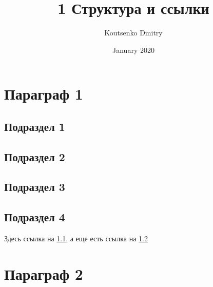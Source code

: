 \documentclass[a4paper,12pt]{article}   %
\title{1 Структура и ссылки}
\author{Koutsenko Dmitry}
\date{January 2020}
\begin{document}

\maketitle

\section{Параграф 1}

\subsection{Подраздел 1}\label{label1}
\subsection{Подраздел 2}\label{label2}
\subsection{Подраздел 3}
\subsection{Подраздел 4}

Здесь ссылка на \ref{label1}, а еще есть ссылка на \ref{label2}

\section{Параграф 2}
\end{document}
